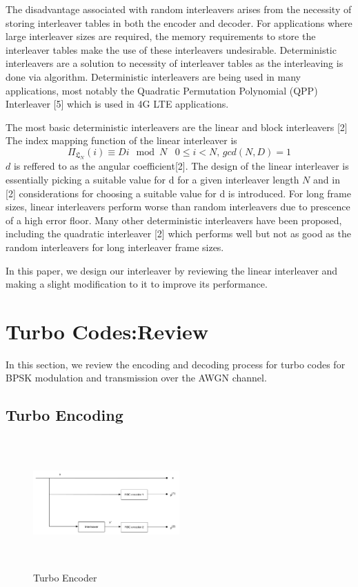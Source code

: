 \documentclass[technicalreport]{ieicej}
\begin{document}
The disadvantage associated with random interleavers arises from the necessity of 
storing interleaver tables in both the encoder and decoder. For applications where 
large interleaver sizes are required, the memory requirements to store the interleaver
tables make the use of these interleavers undesirable.  Deterministic interleavers
are a solution to necessity of interleaver tables as the interleaving is done via 
algorithm. Deterministic interleavers are being used in many applications, most 
notably the Quadratic Permutation Polynomial (QPP) Interleaver [5] which is used 
in 4G LTE applications.

The most basic deterministic interleavers are the linear and block interleavers [2]
The index mapping function of the linear interleaver is 
$$ \Pi_{\mathfrak{L}_N}(i) \equiv Di \mod N \,\,\,\,\, 0 \leq i < N, \, gcd(N,D)=1$$
$d$ is reffered to as the angular coefficient[2]. The design of the linear interleaver is essentially picking a suitable value for d for a
given interleaver length $N$ and in [2] considerations for choosing a suitable 
value for d is introduced. For long frame sizes, linear interleavers perform worse
than random interleavers due to prescence of a high error floor. Many other 
deterministic interleavers have been proposed, including the quadratic interleaver
[2] which performs well but not as good as the random interleavers for long
interleaver frame sizes. 

In this paper, we design our interleaver by reviewing the linear interleaver and making
a slight modification to it to improve its performance.

\section{Turbo Codes:Review}
In this section, we review the encoding and decoding process for turbo codes for BPSK
modulation and transmission over the AWGN channel.
	
\subsection{Turbo Encoding}

\begin{figure}[h!]
\centering
		\includegraphics[height = 5cm, width = 0.5\textwidth]{TurboEncoder.pdf}
		\caption{Turbo Encoder}
		\label{TC}
		\end{figure}
	
\end{document}

